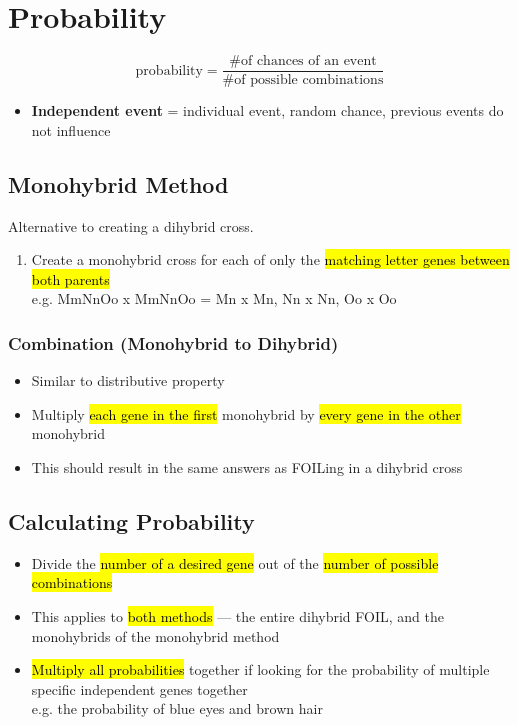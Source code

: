 \documentclass[a4paper,12pt]{article}
\begin{document}
\pagebreak

\section{Probability}
$$\textrm{probability} = \frac{\textrm{\# of chances of an event}}{\textrm{\# of possible combinations}}$$
\begin{itemize}
    \item{\textbf{Independent event} = individual event, random chance, previous events do not influence}
\end{itemize}

\subsection{Monohybrid Method}
Alternative to creating a dihybrid cross.
\begin{enumerate}
    \item{Create a monohybrid cross for each of only the \hl{matching letter genes between both parents} \\ e.g. MmNnOo x MmNnOo = Mn x Mn, Nn x Nn, Oo x Oo}
\end{enumerate}

\subsubsection{Combination (Monohybrid to Dihybrid)}
\begin{itemize}
    \item{Similar to distributive property}
    \item{Multiply \hl{each gene in the first} monohybrid by \hl{every gene in the other} monohybrid}
    \item{This should result in the same answers as FOILing in a dihybrid cross}
\end{itemize}

\subsection{Calculating Probability}
\begin{itemize}
    \item{Divide the \hl{number of a desired gene} out of the \hl{number of possible combinations}}
    \item{This applies to \hl{both methods} --- the entire dihybrid FOIL, and the monohybrids of the monohybrid method}
    \item{\hl{Multiply all probabilities} together if looking for the probability of multiple specific independent genes together \\ e.g. the probability of blue eyes and brown hair}
\end{itemize}
\end{document}
